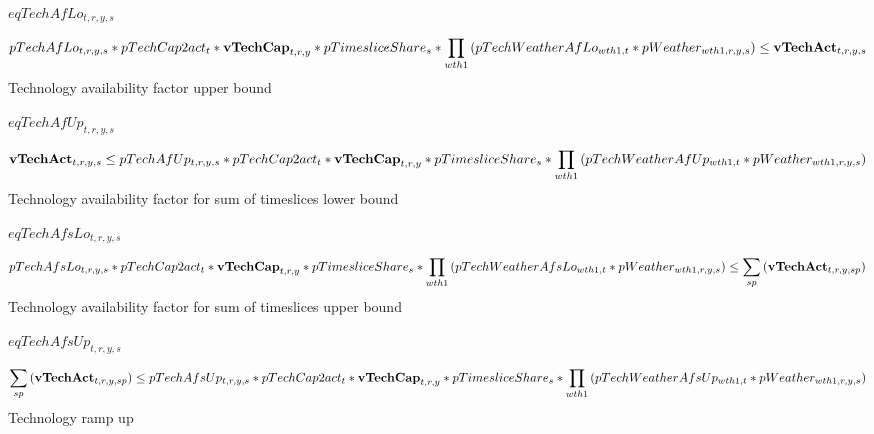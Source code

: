 \documentclass{article}
\begin{document}
$eqTechAfLo_{t,r,y,s}$





\begin{dmath}
pTechAfLo_{t,r,y,s}*pTechCap2act_{t}*{\bf vTechCap}_{t,r,y}*pTimesliceShare_{s}*\prod_{wth1}{\left(pTechWeatherAfLo_{wth1,t}*pWeather_{wth1,r,y,s}\right)}  \le  {\bf vTechAct}_{t,r,y,s}
\end{dmath}
Technology availability factor upper bound







$eqTechAfUp_{t,r,y,s}$





\begin{dmath}
{\bf vTechAct}_{t,r,y,s}  \le  pTechAfUp_{t,r,y,s}*pTechCap2act_{t}*{\bf vTechCap}_{t,r,y}*pTimesliceShare_{s}*\prod_{wth1}{\left(pTechWeatherAfUp_{wth1,t}*pWeather_{wth1,r,y,s}\right)}
\end{dmath}
Technology availability factor for sum of timeslices lower bound







$eqTechAfsLo_{t,r,y,s}$





\begin{dmath}
pTechAfsLo_{t,r,y,s}*pTechCap2act_{t}*{\bf vTechCap}_{t,r,y}*pTimesliceShare_{s}*\prod_{wth1}{\left(pTechWeatherAfsLo_{wth1,t}*pWeather_{wth1,r,y,s}\right)}  \le  \sum_{sp}{\left({\bf vTechAct}_{t,r,y,sp}\right)}
\end{dmath}
Technology availability factor for sum of timeslices upper bound







$eqTechAfsUp_{t,r,y,s}$





\begin{dmath}
\sum_{sp}{\left({\bf vTechAct}_{t,r,y,sp}\right)}  \le  pTechAfsUp_{t,r,y,s}*pTechCap2act_{t}*{\bf vTechCap}_{t,r,y}*pTimesliceShare_{s}*\prod_{wth1}{\left(pTechWeatherAfsUp_{wth1,t}*pWeather_{wth1,r,y,s}\right)}
\end{dmath}
Technology ramp up
\end{document}
